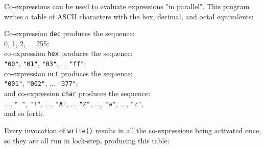 Co-expressions can be used to evaluate
expressions "in parallel".
This program writes a table of ASCII characters with the
hex, decimal, and octal equivalents:


\noindent
Co-expression \texttt{dec} produces the sequence:\\ 0, 1, 2, ... 255;\\
\noindent
co-expression \texttt{hex} produces the sequence:\\ \texttt{"00"},
\texttt{"01"}, \texttt{"03"}, ... \texttt{"ff"};\\
\noindent
co-expression \texttt{oct} produces the sequence:\\ \texttt{"001"},
\texttt{"002"}, ... \texttt{"377"};\\
\noindent
and co-expression \texttt{char} produces the sequence:\\
..., \texttt{" "}, \texttt{"!"}, ..., \texttt{"A"}, ...
\texttt{"Z"}, ..., \texttt{"a"}, ..., \texttt{"z"},\\
\noindent
and so forth.

Every invocation of \texttt{write()} results in all the co-expressions
being activated once, so they are all run in lock-step, producing this
table:

